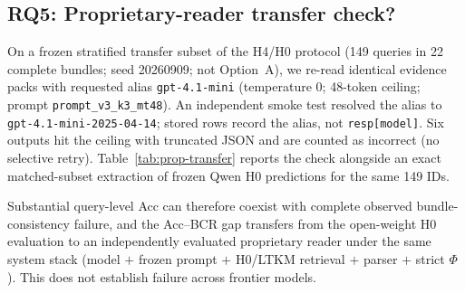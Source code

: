 \subsection{RQ5: Proprietary-reader transfer check?}
\label{sec:prop-transfer}

On a frozen stratified transfer subset of the H4/H0 protocol (149 queries in 22 complete bundles; seed 20260909; not Option~A), we re-read identical evidence packs with requested alias \texttt{gpt-4.1-mini} (temperature 0; 48-token ceiling; prompt \texttt{prompt\_v3\_k3\_mt48}). An independent smoke test resolved the alias to \texttt{gpt-4.1-mini-2025-04-14}; stored rows record the alias, not \texttt{resp[model]}. Six outputs hit the ceiling with truncated JSON and are counted as incorrect (no selective retry). Table~\ref{tab:prop-transfer} reports the check alongside an exact matched-subset extraction of frozen Qwen H0 predictions for the same 149 IDs.

\begin{table}[t]
\centering
\caption{Proprietary-reader transfer check on a frozen stratified H0 subset (NEW; not Option~A). Acc CIs: bundle-level bootstrap (10{,}000 resamples). BCR CIs: exact Clopper--Pearson for observed $0/22$ (two-sided hi $15.4\%$; one-sided $95\%$ upper $12.7\%$). Six GPT-4.1~mini responses hit the 48-token ceiling with truncated JSON and were conservatively counted incorrect (no selective retry).}
\label{tab:prop-transfer}
\small
{}
\end{table}

Substantial query-level Acc can therefore coexist with complete observed bundle-consistency failure, and the Acc--BCR gap transfers from the open-weight H0 evaluation to an independently evaluated proprietary reader under the same system stack (model $+$ frozen prompt $+$ H0/LTKM retrieval $+$ parser $+$ strict $\Phi$). This does not establish failure across frontier models.
